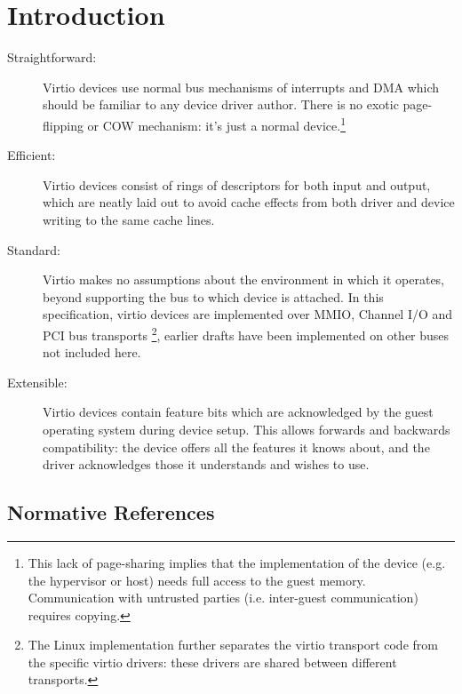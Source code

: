 \chapter{Introduction}



\begin{description}
\item[Straightforward:] Virtio devices use normal bus mechanisms of
  interrupts and DMA which should be familiar to any device driver
  author. There is no exotic page-flipping or COW mechanism: it's just
  a normal device.\footnote{This lack of page-sharing implies that the implementation of the
device (e.g. the hypervisor or host) needs full access to the
guest memory. Communication with untrusted parties (i.e.
inter-guest communication) requires copying.
}

\item[Efficient:] Virtio devices consist of rings of descriptors
  for both input and output, which are neatly laid out to avoid cache
  effects from both driver and device writing to the same cache
  lines.

\item[Standard:] Virtio makes no assumptions about the environment in which
  it operates, beyond supporting the bus to which device is attached.
  In this specification, virtio
  devices are implemented over MMIO, Channel I/O and PCI bus transports
\footnote{The Linux implementation further separates the virtio
transport code from the specific virtio drivers: these drivers are shared
between different transports.
}, earlier drafts
  have been implemented on other buses not included here.

\item[Extensible:] Virtio devices contain feature bits which are
  acknowledged by the guest operating system during device setup.
  This allows forwards and backwards compatibility: the device
  offers all the features it knows about, and the driver
  acknowledges those it understands and wishes to use.
\end{description}

\section{Normative References}\label{sec:Normative References}

